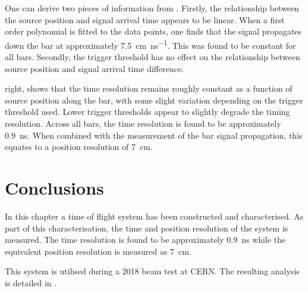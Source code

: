 One can derive two pieces of information from .
Firstly, the relationship between the source position and signal arrival time appears to be linear.
When a first order polynomial is fitted to the data points, one finds that the signal propagates down the bar at approximately \SI{7.5}{\cm\per\nano\second}.
This was found to be constant for all bars.
Secondly, the trigger threshold has no effect on the relationship between source position and signal arrival time difference.

 right, shows that the time resolution remains roughly constant as a function of source position along the bar, with some slight variation depending on the trigger threshold used.
Lower trigger thresholds appear to slightly degrade the timing resolution.
Across all bars, the time resolution is found to be approximately \SI{0.9}{\nano\second}.
When combined with the measurement of the bar signal propagation, this equates to a position resolution of \SI{7}{\cm}.

\section{Conclusions}
\label{sec:hptpc_dtof_characterisation:conclusions}

In this chapter a time of flight system has been constructed and characterised. 
As part of this characterisation, the time and position resolution of the system is measured.
The time resolution is found to be approximately \SI{0.9}{\ns} while the equivalent position resolution is measured as \SI{7}{\cm}.

This system is utilised during a 2018 beam test at CERN.
The resulting analysis is detailed in .
